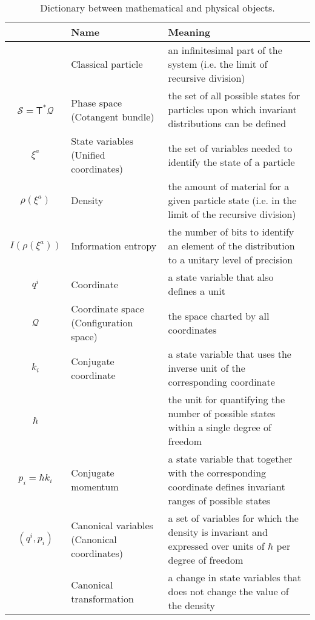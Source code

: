 \documentclass[11pt]{elsarticle}
\begin{document}
\begin{table}[h!]
	\centering
	\begin{tabular}{c p{} p{} }
		& Name & Meaning\\ 
		\hline 
		& Classical particle & an infinitesimal part of the system (i.e. the limit of recursive division) \\ 
		$\mathcal{S} =\mathsf{T}^*\mathcal{Q}$ & Phase space \newline (Cotangent bundle) & the set of all possible states for particles upon which invariant distributions can be defined \\
		$\xi^a$ & State variables \newline (Unified coordinates) & the set of variables needed to identify the state of a particle \\ 
		$\rho(\xi^a)$ & Density & the amount of material for a given particle state (i.e. in the limit of the recursive division)\\ 
		$I(\rho(\xi^a))$ & Information entropy & the number of bits to identify an element of the distribution to a unitary level of precision\\ 
		$q^i$ & Coordinate & a state variable that also defines a unit \\
		$\mathcal{Q}$ & Coordinate space \newline (Configuration space) & the space charted by all coordinates \\
		$k_i$ & Conjugate coordinate & a state variable that uses the inverse unit of the corresponding coordinate \\
		$\hbar$ & & the unit for quantifying the number of possible states within a single degree of freedom \\
		$p_i=\hbar k_i$ & Conjugate momentum & a state variable that together with the corresponding coordinate defines invariant ranges of possible states \\
		$(q^i, p_i)$ & Canonical variables \newline (Canonical coordinates) & a set of variables for which the density is invariant and expressed over units of $\hbar$ per degree of freedom\\ 
		& Canonical transformation & a change in state variables that does not change the value of the density\\ 
	\end{tabular}
	\caption{Dictionary between mathematical and physical objects.}
	\label{dictionary}
\end{table}
\end{document}
